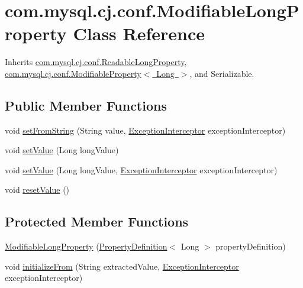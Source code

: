 \hypertarget{classcom_1_1mysql_1_1cj_1_1conf_1_1_modifiable_long_property}{}\section{com.\+mysql.\+cj.\+conf.\+Modifiable\+Long\+Property Class Reference}
\label{classcom_1_1mysql_1_1cj_1_1conf_1_1_modifiable_long_property}


Inherits \mbox{\hyperlink{classcom_1_1mysql_1_1cj_1_1conf_1_1_readable_long_property}{com.\+mysql.\+cj.\+conf.\+Readable\+Long\+Property}}, \mbox{\hyperlink{interfacecom_1_1mysql_1_1cj_1_1conf_1_1_modifiable_property}{com.\+mysql.\+cj.\+conf.\+Modifiable\+Property$<$ Long $>$}}, and Serializable.

\subsection*{Public Member Functions}
\begin{DoxyCompactItemize}
\item 
void \mbox{\hyperlink{classcom_1_1mysql_1_1cj_1_1conf_1_1_modifiable_long_property_a82139fe83023a9bb48bfb3afb065cee0}{set\+From\+String}} (String value, \mbox{\hyperlink{interfacecom_1_1mysql_1_1cj_1_1exceptions_1_1_exception_interceptor}{Exception\+Interceptor}} exception\+Interceptor)
\item 
void \mbox{\hyperlink{classcom_1_1mysql_1_1cj_1_1conf_1_1_modifiable_long_property_a59e148f005d1bb1f1ec70bac45accacb}{set\+Value}} (Long long\+Value)
\item 
void \mbox{\hyperlink{classcom_1_1mysql_1_1cj_1_1conf_1_1_modifiable_long_property_a6efa9fc60605885fe63c9011666e2326}{set\+Value}} (Long long\+Value, \mbox{\hyperlink{interfacecom_1_1mysql_1_1cj_1_1exceptions_1_1_exception_interceptor}{Exception\+Interceptor}} exception\+Interceptor)
\item 
void \mbox{\hyperlink{classcom_1_1mysql_1_1cj_1_1conf_1_1_modifiable_long_property_a6694694d5d91d27600f90923a7e82cc5}{reset\+Value}} ()
\end{DoxyCompactItemize}
\subsection*{Protected Member Functions}
\begin{DoxyCompactItemize}
\item 
\mbox{\hyperlink{classcom_1_1mysql_1_1cj_1_1conf_1_1_modifiable_long_property_a913cd338fec2ae8883ce970c5a5f3db6}{Modifiable\+Long\+Property}} (\mbox{\hyperlink{interfacecom_1_1mysql_1_1cj_1_1conf_1_1_property_definition}{Property\+Definition}}$<$ Long $>$ property\+Definition)
\item 
void \mbox{\hyperlink{classcom_1_1mysql_1_1cj_1_1conf_1_1_modifiable_long_property_a48083a3996ca049922f07be5ca84f20d}{initialize\+From}} (String extracted\+Value, \mbox{\hyperlink{interfacecom_1_1mysql_1_1cj_1_1exceptions_1_1_exception_interceptor}{Exception\+Interceptor}} exception\+Interceptor)
\end{DoxyCompactItemize}


